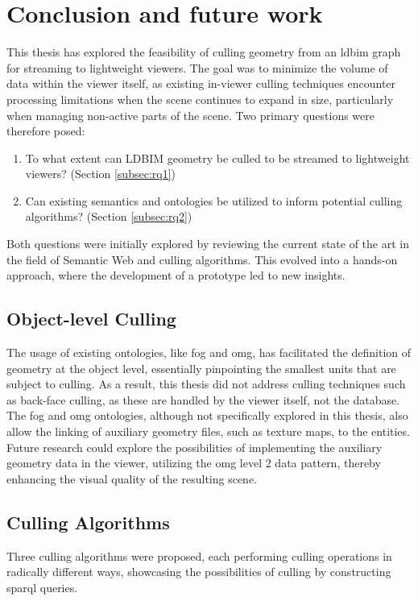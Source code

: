 \chapter{Conclusion and future work} \label{ch:conclusion}
This thesis has explored the feasibility of culling geometry from an \ac{ldbim} graph for streaming to lightweight viewers. The goal was to minimize the volume of data within the viewer itself, as existing in-viewer culling techniques encounter processing limitations when the scene continues to expand in size, particularly when managing non-active parts of the scene. Two primary questions were therefore posed:

\begin{enumerate}
    \item To what extent can LDBIM geometry be culled to be streamed to lightweight viewers? (Section \ref{subsec:rq1})
    \item Can existing semantics and ontologies be utilized to inform potential culling algorithms? (Section \ref{subsec:rq2})
\end{enumerate}

Both questions were initially explored by reviewing the current state of the art in the field of Semantic Web and culling algorithms. This evolved into a hands-on approach, where the development of a prototype led to new insights.

\section{Object-level Culling}
The usage of existing ontologies, like \ac{fog} and \ac{omg}, has facilitated the definition of geometry at the object level, essentially pinpointing the smallest units that are subject to culling. As a result, this thesis did not address culling techniques such as back-face culling, as these are handled by the viewer itself, not the database. The \ac{fog} and \ac{omg} ontologies, although not specifically explored in this thesis, also allow the linking of auxiliary geometry files, such as texture maps, to the entities. Future research could explore the possibilities of implementing the auxiliary geometry data in the viewer, utilizing the \ac{omg} level 2 data pattern, thereby enhancing the visual quality of the resulting scene.

\section{Culling Algorithms}
Three culling algorithms were proposed, each performing culling operations in radically different ways, showcasing the possibilities of culling by constructing \ac{sparql} queries.


